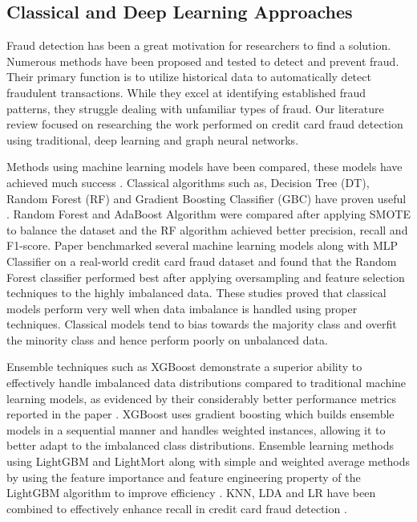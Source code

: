 \documentclass[pdflatex,sn-mathphys-num]{sn-jnl}%
\begin{document}
\subsection{Classical and Deep Learning Approaches}\label{subsec2}

Fraud detection has been a great motivation for researchers to find a solution. Numerous methods have been proposed and tested to detect and prevent fraud. Their primary function is to utilize historical data to automatically detect fraudulent transactions. While they excel at identifying established fraud patterns, they struggle dealing with unfamiliar types of fraud. Our literature review focused on researching the work performed on credit card fraud detection using traditional, deep learning and graph neural networks.

Methods using machine learning models have been compared, these models have achieved much success \cite{awoyemi2017}. Classical algorithms such as, Decision Tree (DT), Random Forest (RF) and Gradient Boosting Classifier (GBC) have proven useful \cite{mohbey2022}. Random Forest and AdaBoost Algorithm were compared \cite{sailusha2020} after applying SMOTE to balance the dataset and the RF algorithm achieved better precision, recall and F1-score. Paper \cite{varmedja2019} benchmarked several machine learning models along with MLP Classifier on a real-world credit card fraud dataset and found that the Random Forest classifier performed best after applying oversampling and feature selection techniques to the highly imbalanced data. These studies proved that classical models perform very well when data imbalance is handled using proper techniques. Classical models tend to bias towards the majority class and overfit the minority class and hence perform poorly on unbalanced data. 

Ensemble techniques such as XGBoost demonstrate a superior ability to effectively handle imbalanced data distributions compared to traditional machine learning models, as evidenced by their considerably better performance metrics reported in the paper \cite{mohbey2022}. XGBoost uses gradient boosting which builds ensemble models in a sequential manner and handles weighted instances, allowing it to better adapt to the imbalanced class distributions. Ensemble learning methods using LightGBM and LightMort along with simple and weighted average methods by using the feature importance and feature engineering property of the LightGBM algorithm to improve efficiency \cite{bakhtiari2023}. KNN, LDA and LR have been combined to effectively enhance recall in credit card fraud detection \cite{chung2023}.
\end{document}
